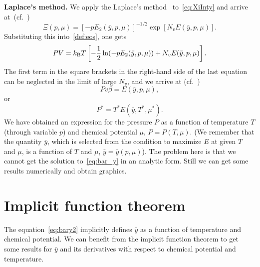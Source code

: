 \documentclass[12pt]{article}
\numberwithin{equation}{section}
\begin{document}
	\textbf{Laplace's method.} We apply the Laplace's method~\cite[(1.21)]{Fedoryuk89} to~\eqref{eq:XiInty} and arrive at~(cf.~\cite[(19)]{KD22})
	\begin{equation}
		\Xi(p,\mu) = [-p E_2(\bar{y},p,\mu)]^{-1/2} \exp[N_v E(\bar{y},p,\mu)].
	\end{equation}
	Substituting this into~\eqref{def:eos}, one gets
	\begin{equation}
		P V = k_{\rm B}T \left[-\frac{1}{2} \ln(-p E_2(\bar{y},p,\mu)) + N_v E(\bar{y},p,\mu)\right].
	\end{equation}
	The first term in the square brackets in the right-hand side of the last equation can be neglected in the limit of large $N_v$, and we arrive at (cf.~\cite[(2.27)]{KKD20})
	\begin{equation}
		P v \beta = E(\bar{y},p,\mu),
	\end{equation}
	or
	\begin{equation}
		\label{eos:reduced}
		P^* = T^* E(\bar{y},T^*,\mu^*).
	\end{equation}
	We have obtained an expression for the pressure $P$ as a function of temperature $T$ (through variable $p$) and chemical potential $\mu$, $P = P(T, \mu)$. (We remember that the quantity $\bar{y}$, which is selected from the condition to maximize $E$ at given $T$ and $\mu$, is a function of $T$ and $\mu$, $\bar{y} = \bar{y}(p,\mu)$). The problem here is that we cannot get the solution to~\eqref{eq:bar_y} in an analytic form. Still we can get some results numerically and obtain graphics.
	
	\section{Implicit function theorem}
	The equation~\eqref{eq:bary2} implicitly defines $\bar{y}$ as a function of temperature and chemical potential. We can benefit from the implicit function theorem to get some results for $\bar{y}$ and its derivatives with respect to chemical potential and temperature.
	
\end{document}
